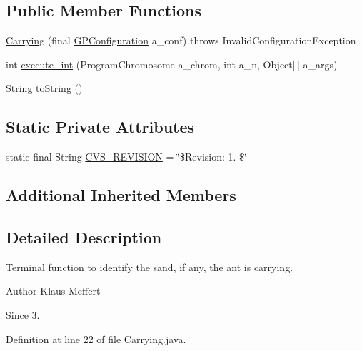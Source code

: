 \subsection*{Public Member Functions}
\begin{DoxyCompactItemize}
\item 
\hyperlink{classexamples_1_1gp_1_1painted_desert_1_1_carrying_a9cd66cf12d090505a64dfb98b704e0a2}{Carrying} (final \hyperlink{classorg_1_1jgap_1_1gp_1_1impl_1_1_g_p_configuration}{G\-P\-Configuration} a\-\_\-conf)  throws Invalid\-Configuration\-Exception 
\item 
int \hyperlink{classexamples_1_1gp_1_1painted_desert_1_1_carrying_a41f47b9c7bce778e35e81a005b1ce799}{execute\-\_\-int} (Program\-Chromosome a\-\_\-chrom, int a\-\_\-n, Object\mbox{[}$\,$\mbox{]} a\-\_\-args)
\item 
String \hyperlink{classexamples_1_1gp_1_1painted_desert_1_1_carrying_aeaa364978742e28acf92d61d6eb6fd07}{to\-String} ()
\end{DoxyCompactItemize}
\subsection*{Static Private Attributes}
\begin{DoxyCompactItemize}
\item 
static final String \hyperlink{classexamples_1_1gp_1_1painted_desert_1_1_carrying_a4d6d5c371d4988778367443c30ca6ef6}{C\-V\-S\-\_\-\-R\-E\-V\-I\-S\-I\-O\-N} = \char`\"{}\$Revision\-: 1. \$\char`\"{}
\end{DoxyCompactItemize}
\subsection*{Additional Inherited Members}


\subsection{Detailed Description}
Terminal function to identify the sand, if any, the ant is carrying.

\begin{DoxyAuthor}{Author}
Klaus Meffert 
\end{DoxyAuthor}
\begin{DoxySince}{Since}
3. 
\end{DoxySince}


Definition at line 22 of file Carrying.\-java.



